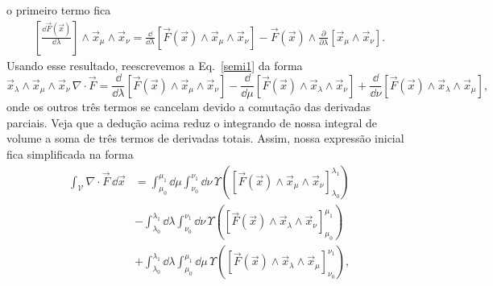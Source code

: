 o primeiro termo fica
\begin{align*}
	\left[\frac{\dd \vec{F}\left(\vec{x}\right)}{\dd \lambda}\right]\wedge\vec{x}_\mu\wedge\vec{x}_\nu = \frac{\dd }{\dd \lambda}\left[\vec{F}\left(\vec{x}\right)\wedge\vec{x}_\mu\wedge\vec{x}_\nu\right] - \vec{F}\left(\vec{x}\right)\wedge\frac{\partial}{\partial\lambda}\left[\vec{x}_\mu\wedge\vec{x}_\nu\right]. \end{align*}
Usando esse resultado, reescrevemos a Eq.~\eqref{semi1} da forma
\begin{equation}\label{pospp}
	\vec{x}_\lambda\wedge\vec{x}_\mu\wedge\vec{x}_\nu\,\nabla\cdot\vec{F} = \frac{\dd }{\dd \lambda}\left[\vec{F}\left(\vec{x}\right)\wedge\vec{x}_\mu\wedge\vec{x}_\nu\right]
	-\frac{\dd }{\dd \mu}\left[\vec{F}\left(\vec{x}\right)\wedge\vec{x}_\lambda\wedge\vec{x}_\nu\right]
	+\frac{\dd }{\dd \nu}\left[\vec{F}\left(\vec{x}\right)\wedge\vec{x}_\lambda\wedge\vec{x}_\mu\right],
\end{equation}
onde os outros três termos se cancelam devido a comutação das derivadas
parciais. Veja que a dedução acima reduz o integrando de nossa integral de
volume a soma de três termos de derivadas totais. Assim, nossa expressão inicial
fica simplificada na forma
\begin{equation}
	\begin{split}
		\int_{\mathcal{V}}\nabla\cdot\vec{F}\, \dd \vec{x} & = \int_{\mu_0}^{\mu_1}\dd \mu\int_{\nu_0}^{\nu_1}\dd \nu\, \Upsilon\left(
		\left[\vec{F}\left(\vec{x}\right)\wedge\vec{x}_\mu\wedge\vec{x}_\nu\right]_{\lambda_0}^{\lambda_1}
		\right)                                                                                                                                                                                                                                 \\
		                                                   & -\int_{\lambda_0}^{\lambda_1}\dd \lambda\int_{\nu_0}^{\nu_1}\dd \nu\, \Upsilon\left(
		\left[\vec{F}\left(\vec{x}\right)\wedge\vec{x}_\lambda\wedge\vec{x}_\nu\right]_{\mu_0}^{\mu_1}
		\right)                                                                                                                                                                                                                                 \\
		                                                   & +\int_{\lambda_0}^{\lambda_1}\dd \lambda\int_{\mu_0}^{\mu_1}\dd \mu\, \Upsilon\left(\left[\vec{F}\left(\vec{x}\right)\wedge\vec{x}_\lambda\wedge\vec{x}_\mu\right]_{\nu_0}^{\nu_1}
		\right),
	\end{split}
\end{equation}
